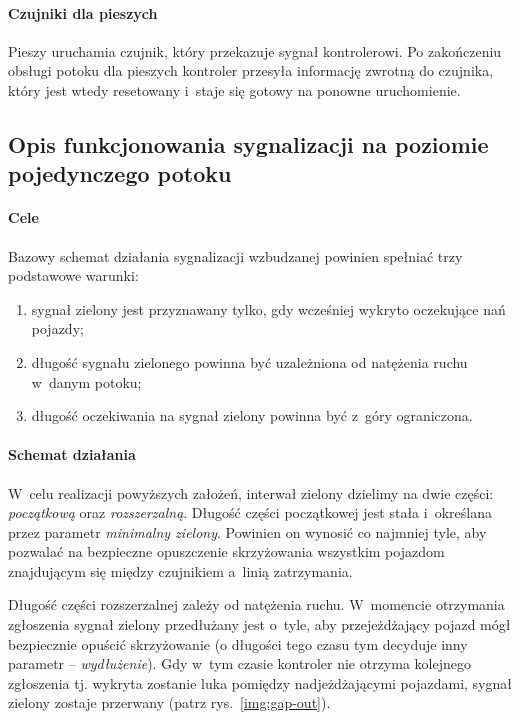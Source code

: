 \documentclass{pracamgr}
\newcommand{\imgr}[1]{rys.~\ref{#1}}
\theoremstyle{plain}
\begin{document}
\paragraph{Czujniki dla pieszych} Pieszy uruchamia czujnik, który
przekazuje sygnał kontrolerowi. Po zakończeniu obsługi potoku dla
pieszych kontroler przesyła informację zwrotną do czujnika, który jest
wtedy resetowany i~staje się gotowy na ponowne uruchomienie.

\subsection{Opis funkcjonowania sygnalizacji na poziomie pojedynczego
potoku}
\label{ss:schemat}

\paragraph{Cele} Bazowy schemat działania sygnalizacji wzbudzanej
powinien spełniać trzy podstawowe warunki:
\begin{enumerate}
  \item sygnał zielony jest przyznawany tylko, gdy wcześniej wykryto
oczekujące nań pojazdy;
  \item długość sygnału zielonego powinna być uzależniona od natężenia
ruchu w~danym potoku;
  \item długość oczekiwania na sygnał zielony powinna być z~góry
ograniczona.
\end{enumerate}

\paragraph{Schemat działania} W~celu realizacji powyższych założeń,
interwał zielony dzielimy na dwie części: \emph{początkową} oraz
\emph{rozszerzalną}. Długość części początkowej jest stała i~określana
przez parametr \emph{minimalny zielony}. Powinien on wynosić co
najmniej tyle, aby pozwalać na bezpieczne opuszczenie skrzyżowania
wszystkim pojazdom znajdującym się między czujnikiem a~linią
zatrzymania.

Długość części rozszerzalnej zależy od natężenia ruchu. W~momencie
otrzymania zgłoszenia sygnał zielony przedłużany jest o~tyle, aby
przejeżdżający pojazd mógł bezpiecznie opuścić skrzyżowanie (o
długości tego czasu tym decyduje inny parametr --
\emph{wydłużenie}). Gdy w~tym czasie kontroler nie otrzyma kolejnego
zgłoszenia tj. wykryta zostanie luka pomiędzy nadjeżdżającymi
pojazdami, sygnał zielony zostaje przerwany (patrz
\imgr{img:gap-out}).
\end{document}
